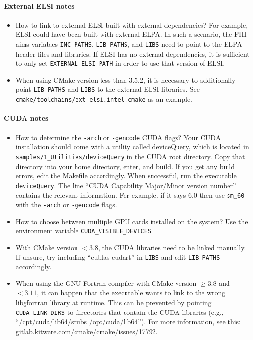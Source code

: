 \paragraph{External ELSI notes}

\begin{itemize}
\item How to link to external ELSI built with external dependencies? For example, ELSI could have been built with external ELPA. In such a scenario, the FHI-aims variables \texttt{INC\_PATHS}, \texttt{LIB\_PATHS}, and \texttt{LIBS} need to point to the ELPA header files and libraries. If ELSI has no external dependencies, it is sufficient to only set \texttt{EXTERNAL\_ELSI\_PATH} in order to use that version of ELSI.
\item When using CMake version less than 3.5.2, it is necessary to additionally point \texttt{LIB\_PATHS} and \texttt{LIBS} to the external ELSI libraries. See \\
  \texttt{cmake/toolchains/ext\_elsi.intel.cmake} as an example.
\end{itemize}

\paragraph{CUDA notes}

\begin{itemize}
\item How to determine the \texttt{-arch} or \texttt{-gencode} CUDA flags? Your CUDA installation should come with a utility called deviceQuery, which is located in \\
  \texttt{samples/1\_Utilities/deviceQuery} in the CUDA root directory. Copy that directory into your home directory, enter, and build. If you get any build errors, edit the Makefile accordingly. When successful, run the executable \texttt{deviceQuery}. The line ``CUDA Capability Major/Minor version number'' contains the relevant information. For example, if it says 6.0 then use \texttt{sm\_60} with the \texttt{-arch} or \texttt{-gencode} flags.
\item How to choose between multiple GPU cards installed on the system? Use the environment variable \texttt{CUDA\_VISIBLE\_DEVICES}.
\item With CMake version $<3.8$, the CUDA libraries need to be linked manually. If unsure, try including ``cublas cudart'' in \texttt{LIBS} and edit \texttt{LIB\_PATHS} accordingly.
\item When using the GNU Fortran compiler with CMake version $\ge3.8$ and $<3.11$, it can happen that the executable wants to link to the wrong libgfortran library at runtime. This can be prevented by pointing \texttt{CUDA\_LINK\_DIRS} to directories that contain the CUDA libraries (e.g., ``/opt/cuda/lib64/stubs /opt/cuda/lib64''). For more information, see this: gitlab.kitware.com/cmake/cmake/issues/17792.
\end{itemize}

